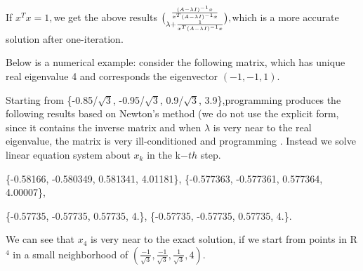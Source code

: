 \documentclass{article}
\begin{document}
If $x^{T}x=1,$we get the above results $\binom{\frac{\left( A-\lambda
I\right) ^{-1}x}{x^{T}\left( A-\lambda I\right) ^{-1}x}}{\lambda +\frac{1}{%
x^{T}\left( A-\lambda I\right) ^{-1}x}},$which is a more accurate solution
after one-iteration.

Below is a numerical example: consider the following matrix, which has
unique real eigenvalue 4 and corresponds the eigenvector $\left(
-1,-1,1\right) .$ %

Starting from \{-0.85/$\sqrt{3}$, -0.95/$\sqrt{3}$, 0.9/$\sqrt{3}$,
3.9\},programming produces the following results based on Newton's method
(we do not use the explicit form, since it contains the inverse matrix and
when $\lambda $ is very near to the real eigenvalue, the matrix is very
ill-conditioned and programming . Instead we solve linear equation system
about $x_{k}$ in the k$-th$ step.

\{-0.58166, -0.580349, 0.581341, 4.01181\}, \{-0.577363, -0.577361,
0.577364, 4.00007\},

\{-0.57735, -0.57735, 0.57735, 4.\}, \{-0.57735, -0.57735, 0.57735, 4.\}.

We can see that $x_{4}$ is very near to the exact solution, if we start from
points in R$^{4}$ in a small neighborhood of $\left( \frac{-1}{\sqrt{3}},%
\frac{-1}{\sqrt{3}},\frac{1}{\sqrt{3}},4\right) .$
\end{document}
